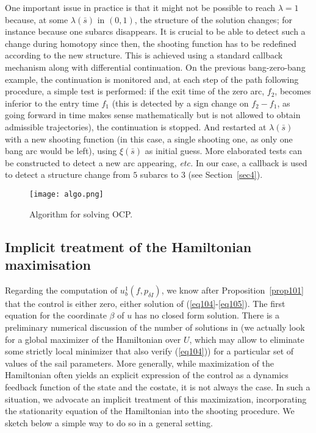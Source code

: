 \documentclass[AMA,STIX1COL]{WileyNJD-v2}
\begin{document}
One important issue in practice is
that it might not be possible to reach $\lambda=1$ because, at some $\lambda(\bar{s})$
in $(0,1)$, the structure
of the solution changes; for instance because one subarcs disappears. It is crucial to be able to detect
such a change during homotopy since then, the shooting function has to be redefined according to the new 
structure. This is achieved using a standard callback mechanism along with differential continuation.
On the previous bang-zero-bang example, the continuation is monitored and, at each step of the path
following procedure, a simple test is performed: if the exit time of the zero arc, $f_2$, becomes inferior to 
the entry time $f_1$ (this is detected by a sign change on $f_2-f_1$, as going forward in time makes sense
mathematically but is not
allowed to obtain admissible trajectories), the continuation is stopped. And restarted at $\lambda(\bar{s})$
with a new shooting function (in this case, a single shooting one, as only one bang arc would be left),
using $\xi(\bar{s})$ as initial guess. More elaborated tests can be constructed to detect a new arc appearing,
\emph{etc.} In our case, a callback is used to detect a structure change from $5$ subarcs to $3$
(see Section~\ref{sec4}).

\begin{figure}[t]
	\centering
		\texttt{[image: algo.png]}
		\caption{Algorithm for solving \ac{OCP}.}
		\label{fig:algo}
\end{figure}

\subsection{Implicit treatment of the Hamiltonian maximisation} \label{s33}
Regarding the computation of $u^1_b(f,p_{\delta I})$,
we know after Proposition~\ref{prop101} that the control is either zero, either solution of
(\ref{eq104}-\ref{eq105}). The first equation for the coordinate $\beta$ of $u$ has no closed form solution.
There is a preliminary numerical discussion of the number of solutions in \cite{mengali-2005a}
(we actually look for a global maximizer of the Hamiltonian over $U$, which may allow to eliminate some strictly
local minimizer that also verify (\ref{eq104})) for a particular set of values of the sail parameters. More
generally, while maximization of the Hamiltonian often yields an explicit expression of the control as a dynamics 
feedback function of the state and the costate, it is not always the case. In such a situation, we advocate an 
implicit treatment of this maximization,
incorporating the stationarity equation of the Hamiltonian
into the shooting procedure.
We sketch below a simple way to do so in a general setting.
\end{document}
